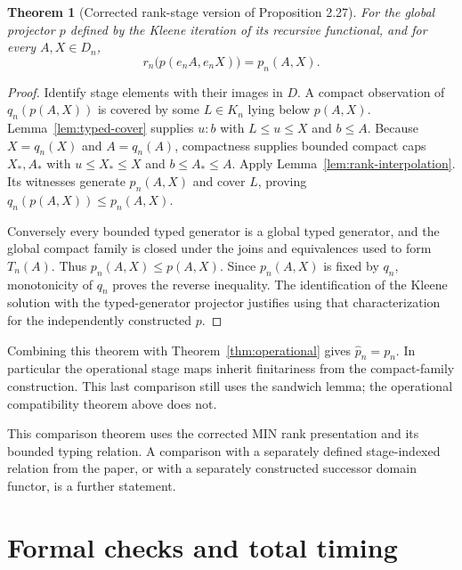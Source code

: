 \documentclass[11pt,a4paper]{article}
\newtheorem{theorem}{Theorem}[section]
\theoremstyle{definition}
\theoremstyle{remark}
\begin{document}
\begin{theorem}[Corrected rank-stage version of Proposition 2.27]
For the global projector $p$ defined by the Kleene iteration of its
recursive functional, and for every $A,X\in D_n$,
\[
 r_n\bigl(p(e_n A,e_n X)\bigr)=p_n(A,X).
\]
\end{theorem}
\begin{proof}
Identify stage elements with their images in $D$. A compact observation
of $q_n(p(A,X))$ is covered by some $L\in K_n$ lying below $p(A,X)$.
Lemma~\ref{lem:typed-cover} supplies
$u:b$ with $L\leq u\leq X$ and $b\leq A$. Because $X=q_n(X)$ and
$A=q_n(A)$, compactness supplies bounded compact caps $X_*,A_*$ with
$u\leq X_*\leq X$ and $b\leq A_*\leq A$. Apply
Lemma~\ref{lem:rank-interpolation}. Its witnesses generate $p_n(A,X)$
and cover $L$, proving $q_n(p(A,X))\leq p_n(A,X)$.

Conversely every bounded typed generator is a global typed generator,
and the global compact family is closed under the joins and equivalences
used to form $T_n(A)$. Thus $p_n(A,X)\leq p(A,X)$. Since $p_n(A,X)$
is fixed by $q_n$, monotonicity of $q_n$ proves the reverse inequality.
The identification of the Kleene solution with the typed-generator
projector justifies using that characterization for the independently
constructed $p$.
\end{proof}

Combining this theorem with Theorem~\ref{thm:operational} gives
$\widehat p_n=p_n$. In particular the operational stage maps inherit
finitariness from the compact-family construction. This last comparison
still uses the sandwich lemma; the operational compatibility theorem
above does not.

This comparison theorem uses the corrected MIN rank presentation and its bounded
typing relation. A comparison with a separately defined stage-indexed
relation from the paper, or with a separately constructed successor
domain functor, is a further statement.

\clearpage
\section*{Formal checks and total timing}\label{sec:formal}
\end{document}
